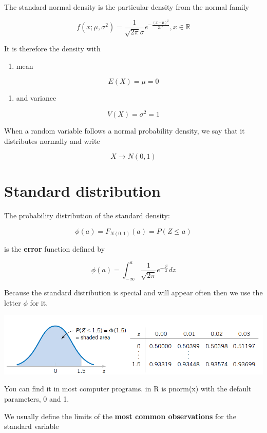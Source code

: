 \documentclass[
]{book}
\providecommand{\tightlist}{%
  \setlength{\itemsep}{0pt}\setlength{\parskip}{0pt}}
\begin{document}
The standard normal density is the particular density from the normal family

\[f(x; \mu, \sigma^2)=\frac{1}{\sqrt{2\pi}\sigma}e^{-\frac{(x-\mu)^2}{2\sigma^2}}, x \in {\mathbb R}\]

It is therefore the density with

\begin{enumerate}
\def\labelenumi{\arabic{enumi})}
\tightlist
\item
  mean
\end{enumerate}

\[E (X)= \mu = 0\]

\begin{enumerate}
\def\labelenumi{\arabic{enumi})}
\setcounter{enumi}{1}
\tightlist
\item
  and variance
\end{enumerate}

\[V (X)=  \sigma^2 =1\]

When a random variable follows a normal probability density, we say that it distributes normally and write

\[X \rightarrow N(0,1)\]

\hypertarget{standard-distribution}{%
\section{Standard distribution}\label{standard-distribution}}

The probability distribution of the standard density:

\[\phi(a)=F_{N(0,1)}(a)=P(Z \leq a)\]

is the \textbf{error} function defined by

\[\phi(a)=\int_{-\infty}^{a} \frac{1}{\sqrt{2\pi}}e^{-\frac{z^2}{2}} dz\]

Because the standard distribution is special and will appear often then we use the letter \(\phi\) for it.

\includegraphics{./figures/st.png}

You can find it in most computer programs. in R is pnorm(x) with the default parameters, 0 and 1.

We usually define the limits of the \textbf{most common observations} for the standard variable
\end{document}
